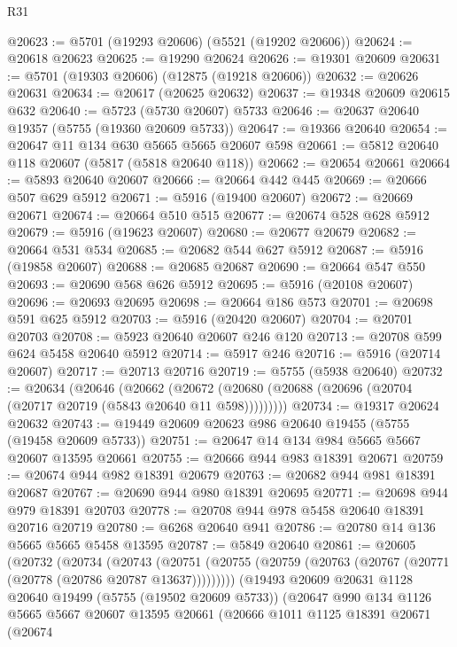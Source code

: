 \begin{lexlean}{R31}
\begin{coremodule}
@20623 := @5701 (@19293 @20606) (@5521 (@19202 @20606))
@20624 := @20618 @20623
@20625 := @19290 @20624
@20626 := @19301 @20609
@20631 := @5701 (@19303 @20606) (@12875 (@19218 @20606))
@20632 := @20626 @20631
@20634 := @20617 (@20625 @20632)
@20637 := @19348 @20609 @20615 @632
@20640 := @5723 (@5730 @20607) @5733
@20646 := @20637 @20640 @19357 (@5755 (@19360 @20609 @5733))
@20647 := @19366 @20640
@20654 := @20647 @11 @134 @630 @5665 @5665 @20607 @598
@20661 := @5812 @20640 @118 @20607 (@5817 (@5818 @20640 @118))
@20662 := @20654 @20661
@20664 := @5893 @20640 @20607
@20666 := @20664 @442 @445
@20669 := @20666 @507 @629 @5912
@20671 := @5916 (@19400 @20607)
@20672 := @20669 @20671
@20674 := @20664 @510 @515
@20677 := @20674 @528 @628 @5912
@20679 := @5916 (@19623 @20607)
@20680 := @20677 @20679
@20682 := @20664 @531 @534
@20685 := @20682 @544 @627 @5912
@20687 := @5916 (@19858 @20607)
@20688 := @20685 @20687
@20690 := @20664 @547 @550
@20693 := @20690 @568 @626 @5912
@20695 := @5916 (@20108 @20607)
@20696 := @20693 @20695
@20698 := @20664 @186 @573
@20701 := @20698 @591 @625 @5912
@20703 := @5916 (@20420 @20607)
@20704 := @20701 @20703
@20708 := @5923 @20640 @20607 @246 @120
@20713 := @20708 @599 @624 @5458 @20640 @5912
@20714 := @5917 @246
@20716 := @5916 (@20714 @20607)
@20717 := @20713 @20716
@20719 := @5755 (@5938 @20640)
@20732 := @20634
    (@20646
      (@20662 (@20672 (@20680 (@20688 (@20696 (@20704 (@20717 @20719 (@5843 @20640 @11 @598)))))))))
@20734 := @19317 @20624 @20632
@20743 := @19449 @20609 @20623 @986 @20640 @19455 (@5755 (@19458 @20609 @5733))
@20751 := @20647 @14 @134 @984 @5665 @5667 @20607 @13595 @20661
@20755 := @20666 @944 @983 @18391 @20671
@20759 := @20674 @944 @982 @18391 @20679
@20763 := @20682 @944 @981 @18391 @20687
@20767 := @20690 @944 @980 @18391 @20695
@20771 := @20698 @944 @979 @18391 @20703
@20778 := @20708 @944 @978 @5458 @20640 @18391 @20716 @20719
@20780 := @6268 @20640 @941
@20786 := @20780 @14 @136 @5665 @5665 @5458 @13595
@20787 := @5849 @20640
@20861 := @20605
    (@20732
      (@20734
        (@20743
          (@20751 (@20755 (@20759 (@20763 (@20767 (@20771 (@20778 (@20786 @20787 @13637)))))))))
        (@19493
          @20609
          @20631
          @1128
          @20640
          @19499
          (@5755 (@19502 @20609 @5733))
          (@20647
            @990
            @134
            @1126
            @5665
            @5667
            @20607
            @13595
            @20661
            (@20666
              @1011
              @1125
              @18391
              @20671
              (@20674

\end{coremodule}
\end{lexlean}
